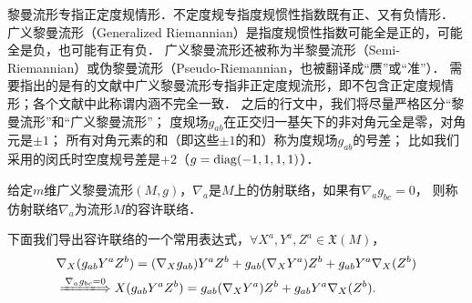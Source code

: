 黎曼流形专指正定度规情形．不定度规专指度规惯性指数既有正、又有负情形．
广义黎曼流形（Generalized Riemannian）是指度规惯性指数可能全是正的，可能全是负，也可能有正有负．
广义黎曼流形还被称为半黎曼流形（Semi-Riemannian）或伪黎曼流形（Pseudo-Riemannian，也被翻译成“赝”或“准”）．
需要指出的是有的文献中广义黎曼流形专指非正定度规流形，即不包含正定度规情形；各个文献中此称谓内涵不完全一致．
之后的行文中，我们将尽量严格区分“黎曼流形”和“广义黎曼流形”；
度规场$g_{ab}$在正交归一基矢下的非对角元全是零，对角元是$\pm 1$；
所有对角元素的和（即这些$\pm 1$的和）称为度规场$g_{ab}$的{\heiti 号差}；
比如我们采用的闵氏时空度规号差是$+2$（$g={\rm diag}(-1,1,1,1)$）．

\begin{definition}
    给定$m$维广义黎曼流形$(M,g)$，$\nabla_a$是$M$上的仿射联络，如果有$\nabla_a g_{bc}=0$，
    则称仿射联络$\nabla_a$为流形$M$的{\heiti 容许联络}．
\end{definition}
下面我们导出容许联络的一个常用表达式，$\forall X^a,Y^a,Z^a\in \mathfrak{X}(M)$，
\begin{align}
    &\nabla_{X}(g_{ab}Y^a Z^b)= (\nabla_{X}g_{ab})Y^a Z^b  +g_{ab}( \nabla_{X}Y^a) Z^b
      +g_{ab}Y^a\nabla_{X}( Z^b)  \notag \\
    &\xLongrightarrow{\nabla_a g_{bc}=0}
    {X}(g_{ab}Y^a Z^b)= g_{ab}( \nabla_{X}Y^a) Z^b
    +g_{ab}Y^a\nabla_{X}( Z^b).  \label{chrg:eqn_connection-compatibility}
\end{align}


